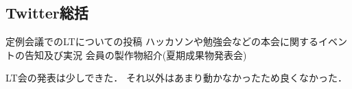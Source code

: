 \subsection*{Twitter総括}

定例会議でのLTについての投稿
ハッカソンや勉強会などの本会に関するイベントの告知及び実況
会員の製作物紹介(夏期成果物発表会) 

LT会の発表は少しできた．
それ以外はあまり動かなかったため良くなかった．
